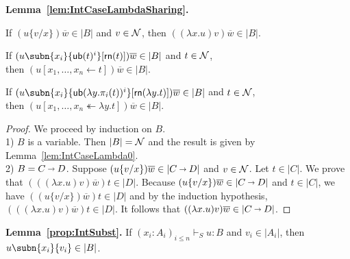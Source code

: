 \medskip
\noindent
\textbf{Lemma~\ref{lem:IntCaseLambdaSharing}.}
\quad
\begin{compactenum}[\upshape(i)]
%
\item If $(u\{v/x\})\overline{w} \in |B|$ and $v\in\mathcal{N}$, then $((\lambda x.u) v)\overline{w} \in |B|$.
%
\item If $(u\subn{x_i}{\sn(t)^i}[\sh (t)])\overline{w} \in |B|$ and $t\in\mathcal{N}$, 
	\\ then $(u[x_1,\dots,x_n \leftarrow t])\overline{w} \in |B|$.
%
\item If $(u\subn{x_i}{\sn(\lambda y.\pi_i(t))^i}[\sh (\lambda y.t)])\overline{w} \in |B|$ and $t\in\mathcal{N}$,
	\\ then $(u[x_1,\dots,x_n \twoheadleftarrow \lambda y.t])\overline{w} \in |B|$.
%
\end{compactenum}


\begin{proof}
 We proceed by induction on $B$.
\\
1) $B$ is a variable. Then $|B| = \mathcal{N}$ and the result is given by Lemma~\ref{lem:IntCaseLambda0}.
\\
2) $B= C\vlim D$.
Suppose $(u\{v/x\})\overline{w} \in |C\vlim D|$ and $v\in\mathcal{N}$. Let $t\in|C|$. We prove that  $(((\lambda x.u) v)\overline{w})t \in |D|$. Because $(u\{v/x\})\overline{w} \in |C\vlim D|$ and $t\in|C|$, we have $((u\{v/x\})\overline{w})t \in |D|$ and by the induction hypothesis, $(((\lambda x.u) v)\overline{w})t \in |D|$. It follows that $((\lambda x.u) v)\overline{w} \in |C\vlim D|$.
\end{proof}
%




\medskip
\noindent
\textbf{Lemma~\ref{prop:IntSubst}.}
\quad
If $(x_i:A_i)_{i\leq n}\vdash_S u:B$ and $v_i \in |A_i|$, then $u\subn{x_i}{v_i} \in |B|$.

